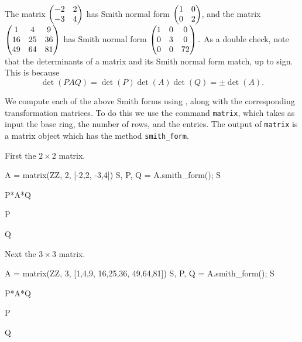 \begin{example}
The matrix $\left( \begin{matrix}-2&2\\-3&4 \end{matrix}\right)$ has Smith normal form
$\left( \begin{matrix}1&0\\0&2 \end{matrix}\right)$,
and the matrix
$\left( \begin{matrix}1&4&9\\16&25&36\\49&64&81 \end{matrix}\right)$
has Smith normal form
$\left( \begin{matrix}1&0&0\\0&3&0\\0&0&72 \end{matrix}\right).$
As a double check, note that the determinants of a matrix and its
Smith normal form match, up to sign. This is because
$$\det(PAQ) = \det(P)\det(A)\det(Q) = \pm \det(A).$$

We compute each of the above Smith forms using \sage,
along with the corresponding transformation matrices.
To do this we use the \sage{} command {\tt matrix},
which takes as input the base ring, the number
of rows, and the entries. The output of {\tt matrix}
is a matrix object which has the method {\tt smith\_form}.

First the $2\times 2$ matrix.
\begin{sagecode}
\begin{sagecell}
A = matrix(ZZ, 2, [-2,2, -3,4])
S, P, Q = A.smith_form(); S
\end{sagecell}
\begin{sageout}
[1 0]
[0 2]
\end{sageout}
\begin{sagecell}
P*A*Q
\end{sagecell}
\begin{sageout}
[1 0]
[0 2]
\end{sageout}
\begin{sagecell}
P
\end{sagecell}
\begin{sageout}
[0 1]
[1 0]
\end{sageout}
\begin{sagecell}
Q
\end{sagecell}
\begin{sageout}
[1 -4]
[1 -3]
\end{sageout}
\end{sagecode}
Next the $3\times3$ matrix.
\begin{sagecode}
\begin{sagecell}
A = matrix(ZZ, 3, [1,4,9, 16,25,36, 49,64,81])
S, P, Q = A.smith_form(); S
\end{sagecell}
\begin{sageout}
[ 1  0  0]
[ 0  3  0]
[ 0  0 72]
\end{sageout}
\begin{sagecell}
P*A*Q
\end{sagecell}
\begin{sageout}
[ 1  0  0]
[ 0  3  0]
[ 0  0 72]
\end{sageout}
\begin{sagecell}
P
\end{sagecell}
\begin{sageout}
[  0   0   1]
[  0   1  -1]
[  1 -20 -17]
\end{sageout}
\begin{sagecell}
Q
\end{sagecell}
\begin{sageout}
[  47   74   93]
[ -79 -125 -156]
[  34   54   67]
\end{sageout}
\end{sagecode}


\end{example}
